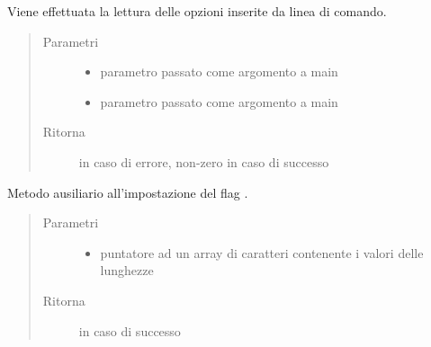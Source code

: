 \documentclass[letterpaper,10pt,italian,openany,oneside]{sphinxmanual}
\begin{document}
\begin{fulllineitems}
\label{\detokenize{code/main:c.parseOpt}}
Viene effettuata la lettura delle opzioni inserite da linea di comando.
\begin{quote}\begin{description}
\item[{Parametri}] \leavevmode\begin{itemize}
\item {} 
 \textendash{} parametro passato come argomento a main

\item {} 
 \textendash{} parametro passato come argomento a main

\end{itemize}

\item[{Ritorna}]  in caso di errore, non-zero in caso di successo

\end{description}\end{quote}

\end{fulllineitems}


\begin{fulllineitems}
\label{\detokenize{code/main:c.getLengthArg}}
Metodo ausiliario all’impostazione del flag .
\begin{quote}\begin{description}
\item[{Parametri}] \leavevmode\begin{itemize}
\item {} 
 \textendash{} puntatore ad un array di caratteri contenente i valori delle lunghezze

\end{itemize}

\item[{Ritorna}]  in caso di successo

\end{description}\end{quote}

\end{fulllineitems}
\end{document}
